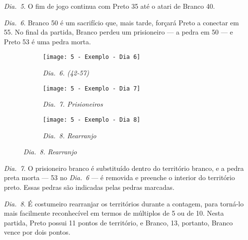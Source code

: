 \emph{Dia.\@~5}. O fim de jogo continua com Preto 35 até o atari de Branco 40.

\emph{Dia.\@~6}. Branco 50 é um sacrifício que, mais tarde, forçará Preto a conectar em 55. No final da partida, Branco perdeu um prisioneiro --- a pedra em 50 --- e Preto 53 é uma pedra morta.

\begin{figure}[h!]
  \centering
  \begin{subfigure}[t]{.28\textwidth}
    \centering
    \texttt{[image: 5 - Exemplo - Dia 6]}
    \captionsetup{justification=centering}
    \caption*{\emph{Dia.\@~6. (42-57)}}
  \end{subfigure}
  \hfill
  \begin{subfigure}[t]{.28\textwidth}
    \centering
    \texttt{[image: 5 - Exemplo - Dia 7]}
    \captionsetup{justification=centering}
    \caption*{\emph{Dia.\@~7. Prisioneiros}}
  \end{subfigure}
  \hfill
  \begin{subfigure}[t]{.28\textwidth}
    \centering
    \texttt{[image: 5 - Exemplo - Dia 8]}
    \captionsetup{justification=centering}
    \caption*{\emph{Dia.\@~8. Rearranjo}}
  \end{subfigure}
\end{figure}

\emph{Dia.\@~7}. O prisioneiro branco é substituído dentro do território branco, e a pedra preta morta --- 53 no \emph{Dia.\@~6} --- é removida e preenche o interior do território preto. Essas pedras são indicadas pelas pedras marcadas.

\emph{Dia.\@~8}. É costumeiro rearranjar os territórios durante a contagem, para torná-lo mais facilmente reconhecível em termos de múltiplos de 5 ou de 10. Nesta partida, Preto possui 11 pontos de território, e Branco, 13, portanto, Branco vence por dois pontos.